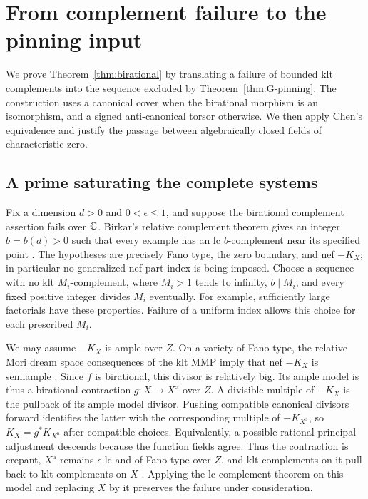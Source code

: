 \section{From complement failure to the pinning input}\label{sec:H}

We prove Theorem~\ref{thm:birational} by translating a failure of bounded
klt complements into the sequence excluded by Theorem~\ref{thm:G-pinning}.
The construction uses a canonical cover when the birational morphism is an
isomorphism, and a signed anti-canonical torsor otherwise.  We then apply
Chen's equivalence and justify the passage between algebraically closed
fields of characteristic zero.

\subsection{A prime saturating the complete systems}

Fix a dimension $d>0$ and $0<\epsilon\le1$, and suppose the birational
complement assertion fails over $\mathbb C$.  Birkar's relative complement
theorem gives an integer $b=b(d)>0$ such that every example has an lc
$b$-complement near its specified point \cite[Theorem~1.8]{BirkarComplements}.
The hypotheses are precisely Fano type, the zero boundary, and nef
$-K_X$; in particular no generalized nef-part index is being imposed.
Choose a sequence with no klt $M_i$-complement, where $M_i>1$ tends to
infinity, $b\mid M_i$, and every fixed positive integer divides $M_i$
eventually.  For example, sufficiently large factorials have these
properties.  Failure of a uniform index allows this choice for each
prescribed $M_i$.

We may assume $-K_X$ is ample over $Z$.  On a variety of Fano type, the
relative Mori dream space consequences of the klt MMP imply that nef
$-K_X$ is semiample \cite{BCHM}.  Since $f$ is birational, this divisor
is relatively big.  Its ample model is thus a birational contraction
$g:X\to X^{\mathrm a}$ over $Z$.  A divisible multiple of $-K_X$ is the
pullback of its ample model divisor.  Pushing compatible canonical
divisors forward identifies the latter with the corresponding multiple
of $-K_{X^{\mathrm a}}$, so $K_X=g^*K_{X^{\mathrm a}}$ after compatible
choices.  Equivalently, a possible rational principal adjustment descends
because the function fields agree.  Thus the contraction is crepant,
$X^{\mathrm a}$ remains $\epsilon$-lc and of Fano type over $Z$, and
klt complements on it pull back to klt complements on $X$
\cite{ProkhorovShokurov}.  Applying the lc complement theorem on this
model and replacing $X$ by it preserves the failure under consideration.

